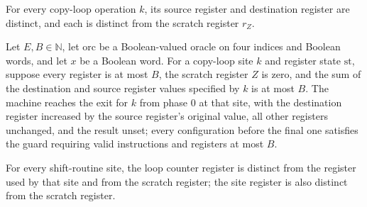 \begin{lemma}
\label{Complexity.LogProg.SavitchARM.cp_ne}
\leanok
{}
For every copy-loop operation $k$, its source register and destination register are
distinct, and each is distinct from the scratch register $r_Z$.
\end{lemma}

\begin{theorem}
\label{Complexity.LogProg.SavitchARM.cp_run}
\leanok
{}
Let $E,B\in\mathbb{N}$, let $\mathrm{orc}$ be a Boolean-valued oracle on four indices
and Boolean words, and let $x$ be a Boolean word. For a copy-loop site $k$ and register
state $\mathrm{st}$, suppose every register is at most $B$, the scratch register $Z$ is
zero, and the sum of the destination and source register values specified by $k$ is at
most $B$. The machine reaches the exit for $k$ from phase $0$ at that site, with the
destination register increased by the source register's original value, all other
registers unchanged, and the result unset; every configuration before the final one
satisfies the guard requiring valid instructions and registers at most $B$.
\end{theorem}

\begin{lemma}
\label{Complexity.LogProg.SavitchARM.sh_ne}
\leanok
{}
For every shift-routine site, the loop counter register is distinct from the register
used by that site and from the scratch register; the site register is also distinct from
the scratch register.
\end{lemma}

